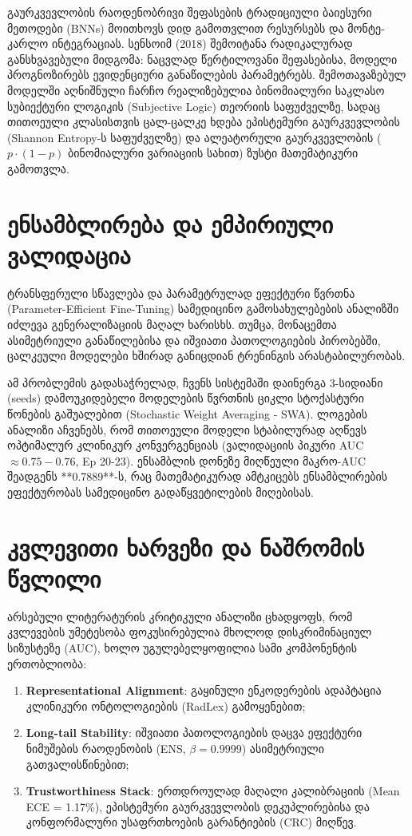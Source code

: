 \documentclass[12pt,a4paper,oneside]{report}
\begin{document}
გაურკვევლობის რაოდენობრივი შეფასების ტრადიციული ბაიესური მეთოდები (BNNs) მოითხოვს დიდ გამოთვლით რესურსებს და მონტე-კარლო ინტეგრაციას. სენსოიმ (2018) შემოიტანა რადიკალურად განსხვავებული მიდგომა: ნაცვლად წერტილოვანი შეფასებისა, მოდელი პროგნოზირებს ევიდენციური განაწილების პარამეტრებს. შემოთავაზებულ მოდელში აღნიშნული ჩარჩო რეალიზებულია ბინომიალური საკლასო სუბიექტური ლოგიკის (Subjective Logic) თეორიის საფუძველზე, სადაც თითოეული კლასისთვის ცალ-ცალკე ხდება ეპისტემური გაურკვევლობის (Shannon Entropy-ს საფუძველზე) და ალეატორული გაურკვევლობის ($p \cdot (1-p)$ ბინომიალური ვარიაციის სახით) ზუსტი მათემატიკური გამოთვლა.

\section{ენსამბლირება და ემპირიული ვალიდაცია}
ტრანსფერული სწავლება და პარამეტრულად ეფექტური წვრთნა (Parameter-Efficient Fine-Tuning) სამედიცინო გამოსახულებების ანალიზში იძლევა გენერალიზაციის მაღალ ხარისხს. თუმცა, მონაცემთა ასიმეტრიული განაწილებისა და იშვიათი პათოლოგიების პირობებში, ცალკეული მოდელები ხშირად განიცდიან ტრენინგის არასტაბილურობას. 

ამ პრობლემის გადასაჭრელად, ჩვენს სისტემაში დაინერგა 3-სიდიანი (seeds) დამოუკიდებელი მოდელების წვრთნის ციკლი სტოქასტური წონების გაშუალებით (Stochastic Weight Averaging - SWA). ლოგების ანალიზი აჩვენებს, რომ თითოეული მოდელი სტაბილურად აღწევს ოპტიმალურ კლინიკურ კონვერგენციას (ვალიდაციის პიკური AUC $\approx 0.75-0.76$, Ep 20-23). ენსამბლის დონეზე მიღწეული მაკრო-AUC შეადგენს **0.7889**-ს, რაც მათემატიკურად ამტკიცებს ენსამბლირების ეფექტურობას სამედიცინო გადაწყვეტილების მიღებისას.
\section{კვლევითი ხარვეზი და ნაშრომის წვლილი}
არსებული ლიტერატურის კრიტიკული ანალიზი ცხადყოფს, რომ კვლევების უმეტესობა ფოკუსირებულია მხოლოდ დისკრიმინაციულ სიზუსტეზე (AUC), ხოლო უგულებელყოფილია სამი კომპონენტის ერთობლიობა:
\begin{enumerate}[leftmargin=1.6em]
    \item \textbf{Representational Alignment}: გაყინული ენკოდერების ადაპტაცია კლინიკური ონტოლოგიების (RadLex) გამოყენებით;
    \item \textbf{Long-tail Stability}: იშვიათი პათოლოგიების დაცვა ეფექტური ნიმუშების რაოდენობის (ENS, $\beta = 0.9999$) ასიმეტრიული გათვალისწინებით;
    \item \textbf{Trustworthiness Stack}: ერთდროულად მაღალი კალიბრაციის (Mean ECE = 1.17\%), ეპისტემური გაურკვევლობის დეკუპლირებისა და კონფორმალური უსაფრთხოების გარანტიების (CRC) მიღწევ.
\end{enumerate}
\end{document}
